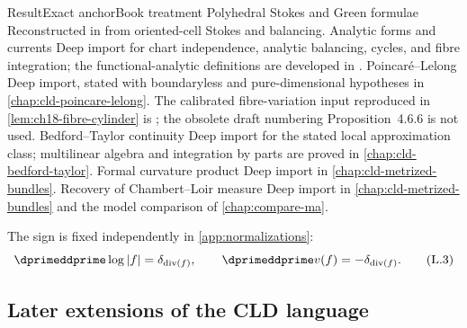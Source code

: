 \begin{AppLProvenanceLedger}{Result}{Exact anchor}{Book treatment}
\AppLProvenanceRecord
  {Polyhedral Stokes and Green formulae}
  {\cite[Proposition~5.11.1]{CLD25}}
  {Reconstructed in 
   from oriented-cell Stokes and balancing.}
\AppLProvenanceRecord
  {Analytic forms and currents}
  {\cite[Chapters~12--16]{CLD25}}
  {Deep import for chart independence, analytic balancing, cycles, and
   fibre integration; the functional-analytic definitions are developed
   in .}
\AppLProvenanceRecord
  {Poincaré--Lelong}
  {\cite[Theorem~16.7.3]{CLD25}}
  {Deep import, stated with boundaryless and pure-dimensional hypotheses
   in \cref{chap:cld-poincare-lelong}.  The calibrated fibre-variation
   input reproduced in \cref{lem:ch18-fibre-cylinder} is
   \cite[Theorem~14.7.2]{CLD25}; the obsolete draft numbering
   Proposition~4.6.6 is not used.}
\AppLProvenanceRecord
  {Bedford--Taylor continuity}
  {\cite[\S\S8.4--8.12 and \S16.9]{CLD25}}
  {Deep import for the stated local approximation class; multilinear
   algebra and integration by parts are proved in
   \cref{chap:cld-bedford-taylor}.}
\AppLProvenanceRecord
  {Formal curvature product}
  {\cite[Theorem~18.5.5]{CLD25}}
  {Deep import in \cref{chap:cld-metrized-bundles}.}
\AppLProvenanceRecord
  {Recovery of Chambert--Loir measure}
  {\cite[Proposition~18.5.8]{CLD25}}
  {Deep import in \cref{chap:cld-metrized-bundles} and the model comparison
   of \cref{chap:compare-ma}.}
\end{AppLProvenanceLedger}

The sign is fixed independently in \cref{app:normalizations}:
\[
 \dprimeddprime\log|f|=\delta_{\operatorname{div}(f)},
 \qquad
 \dprimeddprime v(f)=-\delta_{\operatorname{div}(f)}.
\tag{L.3}\label{eq:appL-cld-sign}
\]

\subsection{Later extensions of the CLD language}
\label{sec:appL-cld-extensions}

